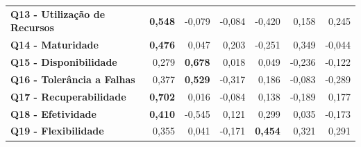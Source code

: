 \begin{apendicesenv}
\begin{longtable}{rrrrrrr}
    \multicolumn{1}{l}{\textbf{Q13 - Utilização de Recursos}} & \textbf{0,548} & -0,079 & -0,084 & -0,420 & 0,158 & 0,245 \\
    \multicolumn{1}{l}{\textbf{Q14 - Maturidade}} & \textbf{0,476} & 0,047 & 0,203 & -0,251 & 0,349 & -0,044 \\
    \multicolumn{1}{l}{\textbf{Q15 - Disponibilidade}} & 0,279 & \textbf{0,678} & 0,018 & 0,049 & -0,236 & -0,122 \\
    \multicolumn{1}{l}{\textbf{Q16 - Tolerância a Falhas}} & 0,377 & \textbf{0,529} & -0,317 & 0,186 & -0,083 & -0,289 \\
    \multicolumn{1}{l}{\textbf{Q17 - Recuperabilidade}} & \textbf{0,702} & 0,016 & -0,084 & 0,138 & -0,189 & 0,177 \\
    \multicolumn{1}{l}{\textbf{Q18 - Efetividade}} & \textbf{0,410} & -0,545 & 0,121 & 0,299 & 0,035 & -0,173 \\
    \multicolumn{1}{l}{\textbf{Q19 - Flexibilidade}} & 0,355 & 0,041 & -0,171 & \textbf{0,454} & 0,321 & 0,291 \\
    \hline
    \end{longtable}%


\end{apendicesenv}
